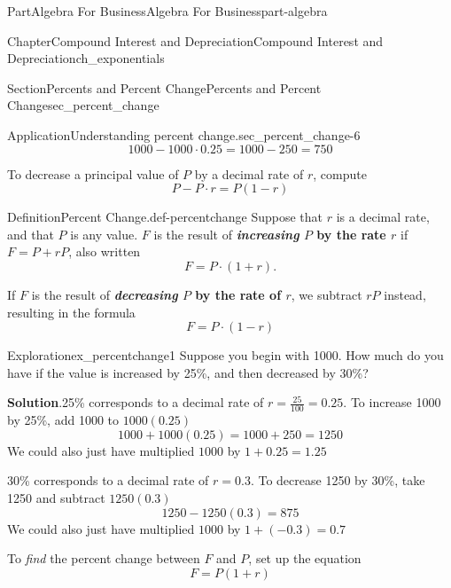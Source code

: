 \documentclass{tufte-book}
\newcommand{\blocktitlefont}{\relax}
\newcommand{\terminology}[1]{\textbf{#1}}
\numberwithin{equation}{chapter}
\begin{document}
\begin{partptx}{Part}{Algebra For Business}{}{Algebra For Business}{}{}{part-algebra}
\begin{chapterptx}{Chapter}{Compound Interest and Depreciation}{}{Compound Interest and Depreciation}{}{}{ch_exponentials}
\begin{sectionptx}{Section}{Percents and Percent Change}{}{Percents and Percent Change}{}{}{sec_percent_change}
\begin{insight}{Application}{Understanding percent change.}{sec_percent_change-6}
\begin{equation*}
1000 - 1000\cdot 0.25 = 1000 - 250 = 750
\end{equation*}
%
\par
To decrease a principal value of \(P\) by a decimal rate of \(r\), compute%
\begin{equation*}
P - P\cdot r = P(1-r)
\end{equation*}
%
\end{insight}
\begin{definition}{Definition}{Percent Change.}{def-percentchange}%
Suppose that \(r\) is a decimal rate, and that \(P\) is any value. \(F\) is the result of \terminology{\emph{increasing} \(P\) by the rate \(r\)} if \(F = P+rP\), also written%
\begin{equation*}
F = P\cdot (1+r)\text{.}
\end{equation*}
%
\par
If \(F\) is the result of \terminology{\emph{decreasing} \(P\) by the rate of \(r\)}, we subtract \(rP\) instead, resulting in the formula%
\begin{equation*}
F = P\cdot (1-r) 
\end{equation*}
%
\end{definition}
\begin{exploration}{Exploration}{}{ex_percentchange1}%
Suppose you begin with \textdollar{}1000.  How much do you have if the value is increased by 25\%, and then decreased by 30\%?%
\par\smallskip%
\noindent\textbf{\blocktitlefont Solution}.\hypertarget{ex_percentchange1-2}{}\quad{}25\% corresponds to a decimal rate of \(r=\frac{25}{100} = 0.25\). To increase \textdollar{}1000 by 25\%, add \textdollar{}1000 to \(1000(0.25)\)%
\begin{equation*}
1000 + 1000(0.25) = 1000 + 250 = 1250
\end{equation*}
We could also just have multiplied \(1000\) by \(1+0.25 = 1.25\)%
\par
30\% corresponds to a decimal rate of \(r = 0.3\).  To decrease \textdollar{}1250 by 30\%, take \textdollar{}1250 and subtract \(1250(0.3)\)%
\begin{equation*}
1250 - 1250(0.3)=875
\end{equation*}
We could also just have multiplied \(1000\) by \(1  + (-0.3) = 0.7\)%
\end{exploration}%
To \emph{find} the percent change between \(F\) and \(P\), set up the equation%
\begin{equation*}
F = P(1+r)

\end{equation*}
\end{sectionptx}
\end{chapterptx}
\end{partptx}
\end{document}
